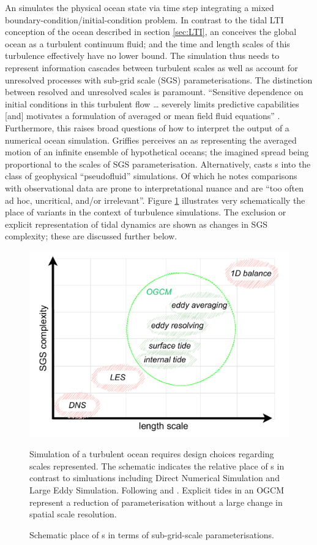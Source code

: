 An \OGCM{} simulates the physical ocean state via time step integrating a mixed boundary-condition/initial-condition problem.
In contrast to the tidal LTI conception of the ocean described in section \ref{sec:LTI}, an \OGCM{} conceives the global ocean as a turbulent continuum fluid; and the time and length scales of this turbulence effectively have no lower bound. The simulation thus needs to represent information cascades between turbulent scales as well as account for unresolved processes with sub-grid scale (SGS) parameterisations.
The distinction between resolved and unresolved scales is paramount.  ``Sensitive dependence on initial conditions in this turbulent flow \dots{} severely limits predictive capabilities [and] motivates a formulation of averaged or mean field fluid equations'' \citep[Sec 2.5]{Griffies:2004vs}.
Furthermore, this raises broad questions of how to interpret the output of a numerical ocean simulation.
Griffies perceives an \OGCM{} as representing the averaged motion of an infinite ensemble of hypothetical oceans; the imagined spread being proportional to the scales of SGS parameterisation.
Alternatively, \citet{Stevens:2001kb} casts \OGCM{}s into the class of geophysical ``pseudofluid'' simulations. Of which he notes comparisons with observational data are prone to interpretational nuance and are ``too often ad hoc, uncritical, and/or irrelevant''\citep[pp 286]{Stevens:2001kb}. 
Figure \ref{fig:ogcmScales} illustrates very schematically the place of \OGCM{} variants in the context of turbulence simulations.   The exclusion or explicit representation of tidal dynamics are shown as changes in SGS complexity; these are discussed further below.
\begin{figure}[!hbt] \centering
  \includegraphics[width=\figwidthBig]{figures/diagrams/ogcm_scales.pdf}
  \caption{Schematic place of \OGCM{}s in terms of sub-grid-scale parameterisations.}
  {Simulation of a turbulent ocean requires design choices regarding scales represented.  The schematic indicates the relative place of \OGCM{}s in contrast to simluations including Direct Numerical Simulation and Large Eddy Simulation. Following \citep[fig 5.2]{Petersen:2012tr} and \citep{Stevens:2001kb}.  Explicit tides in an OGCM represent a reduction of parameterisation without a large change in spatial scale resolution.}
  \label{fig:ogcmScales}
\end{figure}

